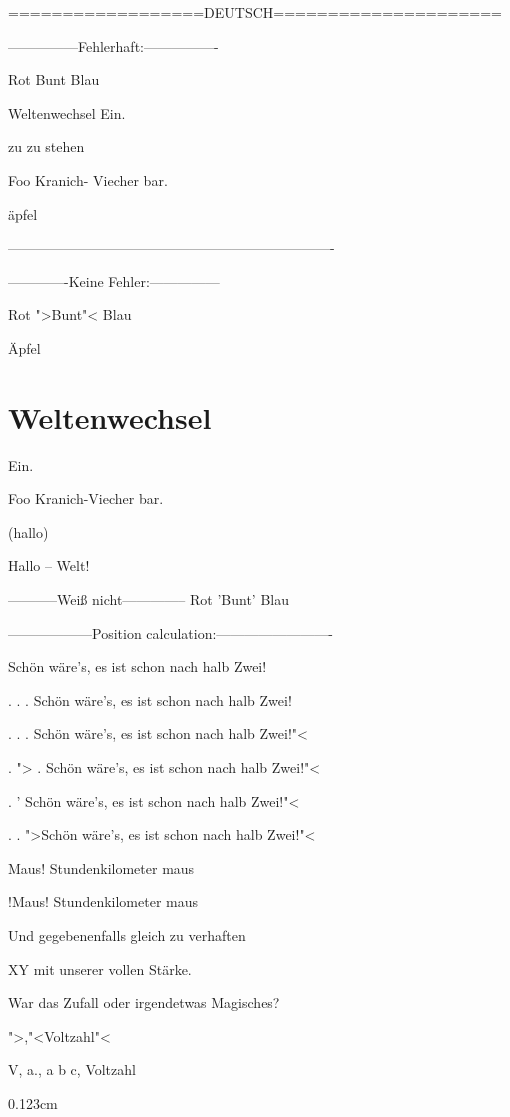 
==================DEUTSCH=====================

---------------Fehlerhaft:----------------



Rot Bunt Blau


Weltenwechsel Ein.


zu zu stehen


Foo Kranich- Viecher bar. 


\"{a}pfel

----------------------------------------------------------------------

-------------Keine Fehler:---------------



Rot ">Bunt"< Blau


\"{A}pfel


\chapter{Weltenwechsel}
Ein.





Foo Kranich-Viecher bar. 


(hallo)

Hallo -- Welt!


-----------Weiß nicht--------------
Rot 'Bunt' Blau




------------------Position calculation:-------------------------

Schön wäre's, es ist schon nach halb Zwei!

. . . Schön wäre's, es ist schon nach halb Zwei! 

. . . Schön wäre's, es ist schon nach halb Zwei!"< 

. "> . Schön wäre's, es ist schon nach halb Zwei!"< 

. ' Schön wäre's, es ist schon nach halb Zwei!"< 

. . ">Schön wäre's, es ist schon nach halb Zwei!"< 


Maus! Stundenkilometer maus


!Maus! Stundenkilometer maus

Und gegebenenfalls gleich zu verhaften

XY mit unserer vollen Stärke.

War das Zufall oder irgendetwas Magisches?

      ">,"<Voltzahl"< 

V, a., a b c, Voltzahl

0.123cm